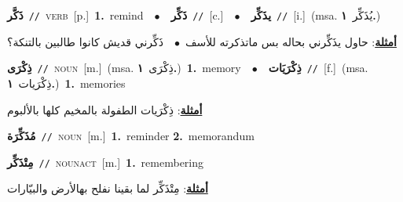 \documentclass[10pt,a4paper,twoside]{article} %
\begin{document}
\begin{multicols}{2}
{\setlength\topsep{0pt}\textbf{\foreignlanguage{arabic}{ذَكَّر}}\ {\color{gray}\texttt{//}\color{black}}\ \textsc{verb}\ [p.]\ \textbf{1.}~remind\ \ $\bullet$\ \ \setlength\topsep{0pt}\textbf{\foreignlanguage{arabic}{ذَكِّر}}\ {\color{gray}\texttt{//}\color{black}}\ [c.]\ \ $\bullet$\ \ \setlength\topsep{0pt}\textbf{\foreignlanguage{arabic}{يذَكِّر}}\ {\color{gray}\texttt{//}\color{black}}\ [i.]\ \color{gray}(msa. \foreignlanguage{arabic}{يُذَكِّر}~\foreignlanguage{arabic}{\textbf{١.}})\color{black}\  \begin{flushright}\color{gray}\foreignlanguage{arabic}{\textbf{\underline{\foreignlanguage{arabic}{أمثلة}}}: حاول يذَكِّرني بحاله بس ماتذكرته للأسف\ $\bullet$\ \  ذَكِّرني قديش كانوا طالبين بالتنكة؟}\end{flushright}\color{black}} \vspace{2mm}

{\setlength\topsep{0pt}\textbf{\foreignlanguage{arabic}{ذِكْرَى}}\ {\color{gray}\texttt{//}\color{black}}\ \textsc{noun}\ [m.]\ \color{gray}(msa. \foreignlanguage{arabic}{ذِكْرَى}~\foreignlanguage{arabic}{\textbf{١.}})\color{black}\ \textbf{1.}~memory\ \ $\bullet$\ \ \setlength\topsep{0pt}\textbf{\foreignlanguage{arabic}{ذِكْرَيَات}}\ {\color{gray}\texttt{//}\color{black}}\ [f.]\ \color{gray}(msa. \foreignlanguage{arabic}{ذِكْرَيات}~\foreignlanguage{arabic}{\textbf{١.}})\color{black}\ \textbf{1.}~memories\  \begin{flushright}\color{gray}\foreignlanguage{arabic}{\textbf{\underline{\foreignlanguage{arabic}{أمثلة}}}: ذِكْرَيات الطفولة بالمخيم كلها بالألبوم}\end{flushright}\color{black}} \vspace{2mm}

{\setlength\topsep{0pt}\textbf{\foreignlanguage{arabic}{مُذَكِّرَة}}\ {\color{gray}\texttt{//}\color{black}}\ \textsc{noun}\ [m.]\ \textbf{1.}~reminder  \textbf{2.}~memorandum\ } \vspace{2mm}

{\setlength\topsep{0pt}\textbf{\foreignlanguage{arabic}{مِتْذَكِّر}}\ {\color{gray}\texttt{//}\color{black}}\ \textsc{noun\textunderscore act}\ [m.]\ \textbf{1.}~remembering\  \begin{flushright}\color{gray}\foreignlanguage{arabic}{\textbf{\underline{\foreignlanguage{arabic}{أمثلة}}}: مِتْذَكِّر لما بقينا نفلح بهالأرض والبيّارات}\end{flushright}\color{black}} \vspace{2mm}


\end{multicols}
\end{document}
